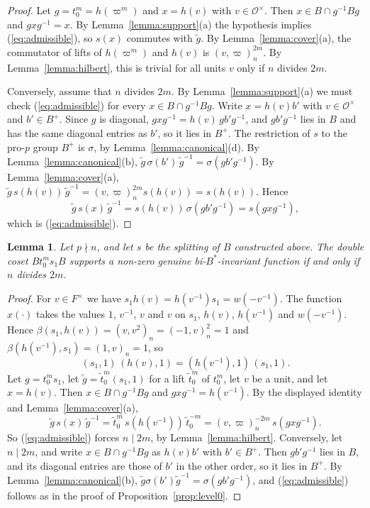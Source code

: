 \documentclass[12pt,letterpaper]{amsart}
\numberwithin{equation}{section}
\newtheorem{lemma}[theorem]{Lemma}
\theoremstyle{definition}
\theoremstyle{remark}
\newcommand{\cO}{\mathcal{O}}
\begin{document}
\begin{proof}
Let $g=t_0^m=h(\varpi^m)$ and $x=h(v)$ with $v\in\cO^\times$. Then
$x\in B\cap g^{-1}Bg$ and $gxg^{-1}=x$. By
Lemma~\ref{lemma:support}(a) the hypothesis implies
(\ref{eq:admissible}), so $s(x)$ commutes with $\tilde g$. By
Lemma~\ref{lemma:cover}(a), the commutator of lifts of $h(\varpi^m)$
and $h(v)$ is $(v,\varpi)_n^{2m}$. By Lemma~\ref{lemma:hilbert}, this
is trivial for all units $v$ only if $n$ divides $2m$.

Conversely, assume that $n$ divides $2m$. By
Lemma~\ref{lemma:support}(a) we must check (\ref{eq:admissible}) for
every $x\in B\cap g^{-1}Bg$. Write $x=h(v)b'$ with $v\in\cO^\times$
and $b'\in B^+$. Since $g$ is diagonal, $gxg^{-1}=h(v)\,gb'g^{-1}$, and
$gb'g^{-1}$ lies in $B$ and has the same diagonal entries as $b'$, so it
lies in $B^+$. The restriction of $s$ to the pro-$p$ group $B^+$ is
$\sigma$, by Lemma~\ref{lemma:canonical}(d). By
Lemma~\ref{lemma:canonical}(b),
$\tilde g\,\sigma(b')\,\tilde g^{-1}=\sigma(gb'g^{-1})$. By
Lemma~\ref{lemma:cover}(a),
$\tilde g\,s(h(v))\,\tilde g^{-1}=(v,\varpi)_n^{2m}s(h(v))=s(h(v))$.
Hence
\[
\tilde g\,s(x)\,\tilde g^{-1}=s(h(v))\,\sigma(gb'g^{-1})
=s(gxg^{-1}),
\]
which is (\ref{eq:admissible}).
\end{proof}

\begin{lemma}
\label{lemma:level0s1}
Let $p\nmid n$, and let $s$ be the splitting of $B$ constructed above.
The double coset $Bt_0^ms_1B$ supports a non-zero genuine
bi-$B^*$-invariant function if and only if $n$ divides $2m$.
\end{lemma}

\begin{proof}
For $v\in F^\times$ we have $s_1h(v)=h(v^{-1})s_1=w(-v^{-1})$. The
function $x(\cdot)$ takes the values $1$, $v^{-1}$, $v$ and $v$ on
$s_1$, $h(v)$, $h(v^{-1})$ and $w(-v^{-1})$. Hence
$\beta(s_1,h(v))=(v,v^2)_n=(-1,v)_n^2=1$ and
$\beta(h(v^{-1}),s_1)=(1,v)_n=1$, so
\[
(s_1,1)\,(h(v),1)=(h(v^{-1}),1)\,(s_1,1).
\]
Let $g=t_0^ms_1$, let $\tilde g=\tilde t_0^m(s_1,1)$ for a lift
$\tilde t_0^m$ of $t_0^m$, let $v$ be a unit, and let $x=h(v)$. Then
$x\in B\cap g^{-1}Bg$ and $gxg^{-1}=h(v^{-1})$. By the displayed
identity and Lemma~\ref{lemma:cover}(a),
\[
\tilde g\,s(x)\,\tilde g^{-1}
=\tilde t_0^m\,s(h(v^{-1}))\,\tilde t_0^{-m}
=(v,\varpi)_n^{-2m}\,s(gxg^{-1}).
\]
So (\ref{eq:admissible}) forces $n\mid 2m$, by
Lemma~\ref{lemma:hilbert}. Conversely, let $n\mid 2m$, and write
$x\in B\cap g^{-1}Bg$ as $h(v)b'$ with $b'\in B^+$. Then $gb'g^{-1}$
lies in $B$, and its diagonal entries are those of $b'$ in the other
order, so it lies in $B^+$. By Lemma~\ref{lemma:canonical}(b),
$\tilde g\sigma(b')\tilde g^{-1}=\sigma(gb'g^{-1})$, and
(\ref{eq:admissible}) follows as in the proof of
Proposition~\ref{prop:level0}.
\end{proof}
\end{document}
